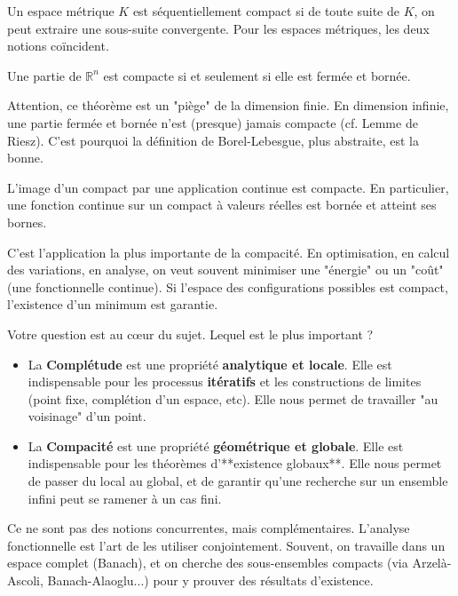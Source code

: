 \begin{definition}
    Un espace métrique $K$ est séquentiellement compact si de toute suite de $K$, on peut extraire une sous-suite convergente. Pour les espaces métriques, les deux notions coïncident.
\end{definition}

\begin{theorem}
    Une partie de $\mathbb{R}^n$ est compacte si et seulement si elle est fermée et bornée.
\end{theorem}

\begin{remark}
    Attention, ce théorème est un "piège" de la dimension finie. En dimension infinie, une partie fermée et bornée n'est (presque) jamais compacte (cf. Lemme de Riesz). C'est pourquoi la définition de Borel-Lebesgue, plus abstraite, est la bonne.
\end{remark}

\begin{theorem}
    L'image d'un compact par une application continue est compacte. En particulier, une fonction continue sur un compact à valeurs réelles est bornée et atteint ses bornes.
\end{theorem}

\begin{application}
    C'est l'application la plus importante de la compacité. En optimisation, en calcul des variations, en analyse, on veut souvent minimiser une "énergie" ou un "coût" (une fonctionnelle continue). Si l'espace des configurations possibles est compact, l'existence d'un minimum est garantie.
\end{application}

\begin{remark}
    Votre question est au cœur du sujet. Lequel est le plus important ?
    \begin{itemize}
        \item La \textbf{Complétude} est une propriété \textbf{analytique et locale}. Elle est indispensable pour les processus \textbf{itératifs} et les constructions de limites (point fixe, complétion d'un espace, etc). Elle nous permet de travailler "au voisinage" d'un point.
        \item La \textbf{Compacité} est une propriété \textbf{géométrique et globale}. Elle est indispensable pour les théorèmes d'**existence globaux**. Elle nous permet de passer du local au global, et de garantir qu'une recherche sur un ensemble infini peut se ramener à un cas fini.
    \end{itemize}
    Ce ne sont pas des notions concurrentes, mais complémentaires. L'analyse fonctionnelle est l'art de les utiliser conjointement. Souvent, on travaille dans un espace complet (Banach), et on cherche des sous-ensembles compacts (via Arzelà-Ascoli, Banach-Alaoglu...) pour y prouver des résultats d'existence.
\end{remark}

